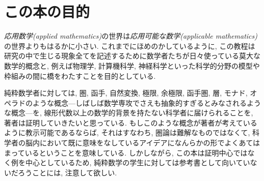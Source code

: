 
\section{この本の目的}


\emph{応用数学(applied mathematics)}の世界は\emph{応用可能な数学(applicable mathematics)}の世界よりもはるかに小さい. これまでにほめのかしているように, この教程は研究の中で生じる現象全てを記述するために数学者たちが日々使っている莫大な数学的概念と, 例えば物理学, 計算機科学, 神経科学といった科学的分野の模型や枠組みの間に橋をわたすことを目的としている.


純粋数学者に対しては, 圏, 函手, 自然変換, 極限, 余極限, 函手圏, 層, モナド, オペラドのような概念---しばしば数学専攻でさえも抽象的すぎるとみなされるような概念---を, 線形代数以上の数学的背景を持たない科学者に届けられることを, 著者は証明していきたいと思っている. もしこのような概念が著者が考えているように教示可能であるならば, それはすなわち, 圏論は難解なものではなくて, 科学者の脳内において既に意味をなしているアイデアになんらかの形でよくあてはまっているということを意味している. しかしながら, この本は証明中心ではなく例を中心としているため, 純粋数学の学生に対しては参考書として向いていないだろうことには, 注意して欲しい.

